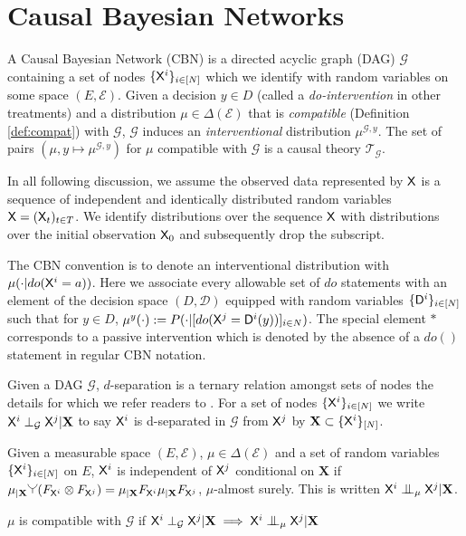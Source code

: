 \section{Causal Bayesian Networks}

A Causal Bayesian Network (CBN) is a directed acyclic graph (DAG) $\mathcal{G}$ containing a set of nodes $\{\mathsf{X}^i\}_{i\in[N]}$ which we identify with random variables on some space $(E,\mathcal{E})$. Given a decision $y\in D$ (called a \emph{do-intervention} in other treatments) and a distribution $\mu\in \Delta(\mathcal{E})$ that is \emph{compatible} (Definition \ref{def:compat}) with $\mathcal{G}$, $\mathcal{G}$ induces an \emph{interventional} distribution $\mu^{\mathcal{G},y}$. The set of pairs $(\mu,y\mapsto \mu^{\mathcal{G},y})$ for $\mu$ compatible with $\mathcal{G}$ is a causal theory $\mathscr{T}_{\mathcal{G}}$.

In all following discussion, we assume the observed data represented by $\mathsf{X}$ is a sequence of independent and identically distributed random variables $\mathsf{X}=(\mathsf{X}_t)_{t\in T}$. We identify distributions over the sequence $\mathsf{X}$ with distributions over the initial observation $\mathsf{X}_0$ and subsequently drop the subscript.

The CBN convention is to denote an interventional distribution with $\mu(\cdot|do(\mathsf{X}^i=a))$. Here we associate every allowable set of $do$ statements with an element of the decision space $(D,\mathcal{D})$ equipped with random variables $\{\mathsf{D}^i\}_{i\in[N]}$ such that for $y\in D$, $\mu^y(\cdot) := P(\cdot|[do(\mathsf{X}^j=\mathsf{D}^i(y))]_{i\in N})$. The special element $*$ corresponds to a passive intervention which is denoted by the absence of a $do()$ statement in regular CBN notation.

\begin{definition}[Compatibility]\label{def:compat}
Given a DAG $\mathcal{G}$, $d$-separation is a ternary relation amongst sets of nodes the details for which we refer readers to \cite{pearl_causality:_2009}. For a set of nodes $\{\mathsf{X}^i\}_{i\in[N]}$ we write $\mathsf{X}^i\perp_{\mathcal{G}} \mathsf{X}^j | \mathbf{X}$ to say $\mathsf{X}^i$ is d-separated in $\mathcal{G}$ from $\mathsf{X}^j$ by $\mathbf{X}\subset \{\mathsf{X}^i\}_{[N]}$.

Given a measurable space $(E,\mathcal{E})$, $\mu\in \Delta(\mathcal{E})$ and a set of random variables $\{\mathsf{X}^i\}_{i\in[N]}$ on $E$, $\mathsf{X}^i$ is independent of $\mathsf{X}^j$ conditional on $\mathbf{X}$ if $\mu_{|\mathbf{X}} \splitter{0.13}(F_{\RV{X}^i}\otimes F_{\RV{X}^j}) = \mu_{|\mathbf{X}} F_{\RV{X}^i} \mu_{|\mathbf{X}}F_{\RV{X}^j}$, $\mu$-almost surely. This is written $\RV{X}^i\CI_\mu \RV{X}^j|\mathbf{X}$.

$\mu$ is compatible with $\mathcal{G}$ if $\RV{X}^i\perp_{\mathcal{G}} \RV{X}^j | \mathbf{X} \implies \RV{X}^i\CI_\mu \RV{X}^j|\mathbf{X}$
\end{definition}

